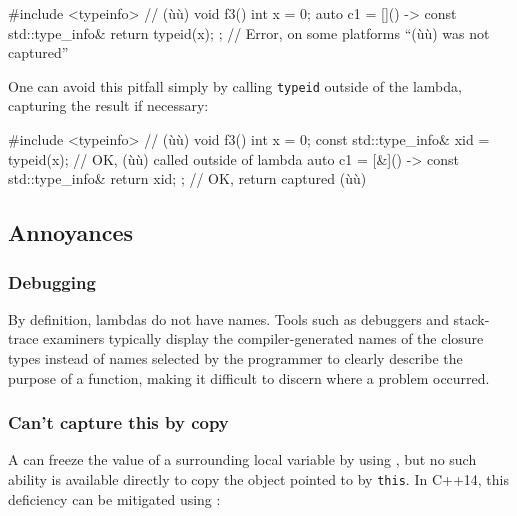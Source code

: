 \begin{emcppslisting}
#include <typeinfo>  // (ù{}ù)
void f3()
{
    int x = 0;
    auto c1 = []() -> const std::type_info& { return typeid(x); };
        // Error, on some platforms ``(ù{}ù) was not captured''
}
\end{emcppslisting}


\noindent One can avoid this pitfall simply by calling \lstinline!typeid! outside of
the lambda, capturing the result if necessary:

\begin{emcppslisting}
#include <typeinfo>  // (ù{}ù)
void f3()
{
    int x = 0;
    const std::type_info& xid = typeid(x);
        // OK, (ù{}ù) called outside of lambda
    auto c1 = [&]() -> const std::type_info& { return xid; };
        // OK, return captured (ù{}ù)
}
\end{emcppslisting}


\subsection[Annoyances]{Annoyances}\label{annoyances}

\subsubsection[Debugging]{Debugging}\label{debugging}

By definition, lambdas do not have names. Tools such as debuggers and
stack-trace examiners typically display the compiler-generated names of
the closure types instead of names selected by the programmer to clearly
describe the purpose of a function, making it difficult to discern where
a problem occurred.

\subsubsection[Can’t capture \lstinline!*this! by copy]{Can’t capture {\SubsubsecCode *this} by copy}\label{can’t-capture-*this-by-copy}

A  can freeze the value of a surrounding local
variable by using , but no such ability is
available directly to copy the object pointed to by \lstinline!this!. In
C++14, this deficiency can be mitigated using :

